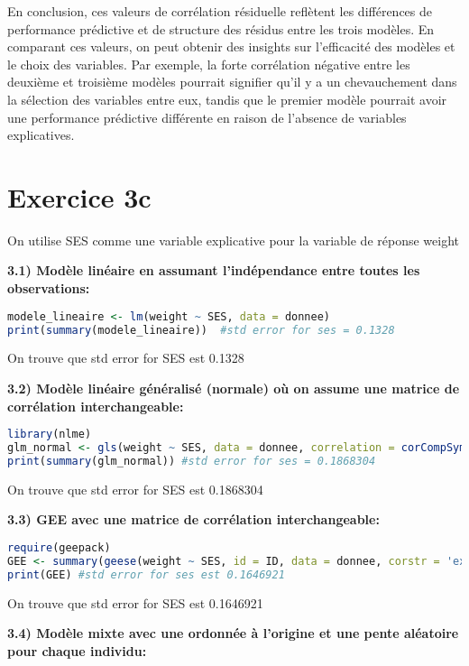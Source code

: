 \documentclass[12pt,a4paper]{article}
\begin{document}
En conclusion, ces valeurs de corrélation résiduelle reflètent les différences de performance prédictive et de structure des résidus entre les trois modèles. En comparant ces valeurs, on peut obtenir des insights sur l'efficacité des modèles et le choix des variables. Par exemple, la forte corrélation négative entre les deuxième et troisième modèles pourrait signifier qu'il y a un chevauchement dans la sélection des variables entre eux, tandis que le premier modèle pourrait avoir une performance prédictive différente en raison de l'absence de variables explicatives.
   
\section{Exercice 3c}

On utilise SES comme une variable explicative pour la variable de réponse weight

\textbf{3.1) Modèle linéaire en assumant l'indépendance entre toutes les observations:}

\begin{lstlisting}[language=R]
modele_lineaire <- lm(weight ~ SES, data = donnee)
print(summary(modele_lineaire))  #std error for ses = 0.1328
\end{lstlisting}

On trouve que std error for SES est 0.1328

\textbf{3.2) Modèle linéaire généralisé (normale) où on assume une matrice de corrélation interchangeable:}

\begin{lstlisting}[language=R]
library(nlme)
glm_normal <- gls(weight ~ SES, data = donnee, correlation = corCompSymm(form = ~ 1 | SES))
print(summary(glm_normal)) #std error for ses = 0.1868304
\end{lstlisting}

On trouve que std error for SES est 0.1868304

\textbf{3.3) GEE avec une matrice de corrélation interchangeable:}

\begin{lstlisting}[language=R]
require(geepack)
GEE <- summary(geese(weight ~ SES, id = ID, data = donnee, corstr = 'exchangeable'))
print(GEE) #std error for ses est 0.1646921
\end{lstlisting}

On trouve que std error for SES est 0.1646921

\textbf{3.4) Modèle mixte avec une ordonnée à l'origine et une pente aléatoire pour chaque individu:}
\end{document}
